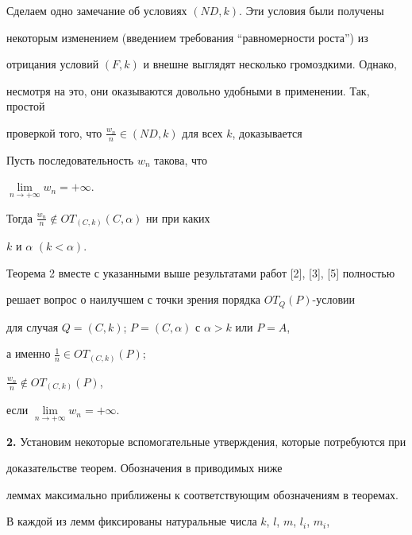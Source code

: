 Сделаем одно замечание об условиях $(ND, k)$. Эти условия были получены 


некоторым изменением (введением требования ``равномерности роста'') из


отрицания условий $(F, k)$ и внешне выглядят несколько громоздкими. Однако,


несмотря на это, они оказываются довольно удобными в применении. Так, простой


проверкой того, что ${\frac{w_n}{n}} \in (ND, k)$ для всех $k$, доказывается








\begin{thm}


Пусть последовательность ${w_n}$ такова, что


$\lim\limits_{n \to+\infty} w_n=+\infty$. 


Тогда $\frac{w_n}{n} \notin OT_{(C, k)}(C,\alpha)$ ни при каких


$k$ и $\alpha$   $(k<\alpha)$.


\end{thm}








Теорема 2 вместе с указанными выше результатами работ [2], [3], [5] полностью 


решает вопрос о наилучшем с точки зрения порядка $OT_{Q} (P)$-условии 


для случая $Q=(C, k)$; $P=(C, \alpha)$ с $\alpha>k$ или $P=A$, 


а именно $\frac{1}{n} \in OT_{(C, k)} (P)$; 


$\frac{w_n}{n} \notin OT_{(C, k)} (P)$, 


если $\lim\limits_{n \to+\infty} w_n=+\infty$. 


\medskip 





{\bf 2.} Установим некоторые вспомогательные утверждения, которые потребуются при


доказательстве теорем. Обозначения в приводимых ниже 


леммах максимально приближены к соответствующим обозначениям в теоремах.





В каждой из лемм фиксированы натуральные числа $k$, $l$, $m$, $l_i$, $m_i$, 


